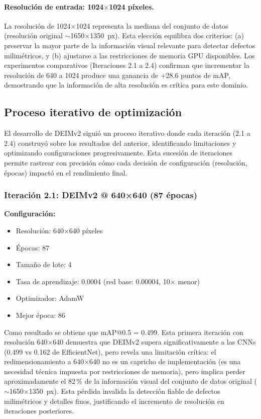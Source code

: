 \paragraph{Resolución de entrada: 1024$\times$1024 píxeles.}
La resolución de 1024$\times$1024 representa la mediana del conjunto de datos (resolución original $\sim$1650$\times$1350~px). Esta elección equilibra dos criterios: (a) preservar la mayor parte de la información visual relevante para detectar defectos milimétricos, y (b) ajustarse a las restricciones de memoria GPU disponibles. Los experimentos comparativos (Iteraciones 2.1 a 2.4) confirman que incrementar la resolución de 640 a 1024 produce una ganancia de +28.6 puntos de mAP, demostrando que la información de alta resolución es crítica para este dominio.

\subsection{Proceso iterativo de optimización}

El desarrollo de DEIMv2 siguió un proceso iterativo donde cada iteración (2.1 a 2.4) construyó sobre los resultados del anterior, identificando limitaciones y optimizando configuraciones progresivamente. Esta sucesión de iteraciones permite rastrear con precisión cómo cada decisión de configuración (resolución, épocas) impactó en el rendimiento final.

\subsubsection{Iteración 2.1: DEIMv2 @ 640×640 (87 épocas)}

\textbf{Configuración:}
\begin{itemize}
    \item Resolución: 640×640 píxeles
    \item Épocas: 87
    \item Tamaño de lote: 4
    \item Tasa de aprendizaje: 0.0004 (red base: 0.00004, 10× menor)
    \item Optimizador: AdamW
    \item Mejor época: 86
\end{itemize}

Como resultado se obtiene que mAP@0.5 = 0.499. Esta primera iteración con resolución 640×640 demuestra que DEIMv2 supera significativamente a las CNNs (0.499 vs 0.162 de EfficientNet), pero revela una limitación crítica: el redimensionamiento a 640×640 no es un capricho de implementación (es una necesidad técnica impuesta por restricciones de memoria), pero implica perder aproximadamente el 82\,\% de la información visual del conjunto de datos original ($\sim$1650×1350~px). Esta pérdida invalida la detección fiable de defectos milimétricos y detalles finos, justificando el incremento de resolución en iteraciones posteriores.

